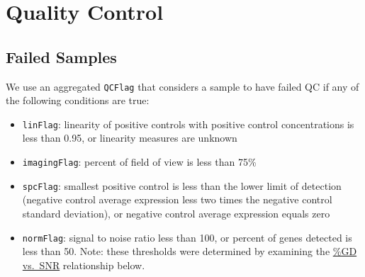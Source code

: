 \documentclass[
]{report}
\providecommand{\tightlist}{%
  \setlength{\itemsep}{0pt}\setlength{\parskip}{0pt}}
\begin{document}
\hypertarget{quality-control}{%
\section{Quality Control}\label{quality-control}}

\hypertarget{failed-samples}{%
\subsection{Failed Samples}\label{failed-samples}}

We use an aggregated \texttt{QCFlag} that considers a sample to have failed QC if any of the following conditions are true:

\begin{itemize}
\tightlist
\item
  \texttt{linFlag}: linearity of positive controls with positive control concentrations is less than 0.95, or linearity measures are unknown
\item
  \texttt{imagingFlag}: percent of field of view is less than 75\%
\item
  \texttt{spcFlag}: smallest positive control is less than the lower limit of detection (negative control average expression less two times the negative control standard deviation), or negative control average expression equals zero
\item
  \texttt{normFlag}: signal to noise ratio less than 100, or percent of genes detected is less than 50. Note: these thresholds were determined by examining the \protect\hyperlink{gd-vs.-snr}{\%GD vs.~SNR} relationship below.
\end{itemize}
\end{document}
